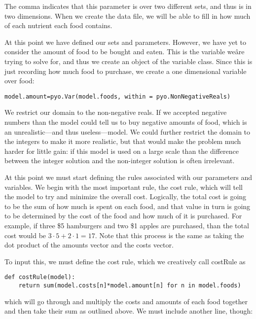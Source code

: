 \documentclass{article}
\begin{document}
The comma indicates that this parameter is over two different sets, and thus is in two dimensions.  When we create the data file, we will be able to fill in how much of each nutrient each food contains.

At this point we have defined our sets and parameters.  However, we have yet to consider the amount of food to be bought and eaten.  This is the variable weâre trying to solve for, and thus we create an object of the variable class.  Since this is just recording how much food to purchase, we create a one dimensional variable over food:

\begin{verbatim}model.amount=pyo.Var(model.foods, within = pyo.NonNegativeReals) \end{verbatim}

We restrict our domain to the non-negative reals.  If we accepted negative numbers than the model could tell us to buy negative amounts of food, which is an unrealistic---and thus useless---model.  We could further restrict the domain to the integers to make it more realistic, but that would make the problem much harder for little gain: if this model is used on a large scale than the difference between the integer solution and the non-integer solution is often irrelevant.

At this point we must start defining the rules associated with our parameters and variables.  We begin with the most important rule, the cost rule, which will tell the model to try and minimize the overall cost.  Logically, the total cost is going to be the sum of how much is spent on each food, and that value in turn is going to be determined by the cost of the food and how much of it is purchased.  For example, if three \$5 hamburgers and two \$1 apples are purchased, than the total cost would be $3 \cdot 5 + 2 \cdot 1 = 17$.  Note that this process is the same as taking the dot product of the amounts vector and the costs vector.

To input this, we must define the cost rule, which we creatively call costRule as

\begin{verbatim}def costRule(model):
    return sum(model.costs[n]*model.amount[n] for n in model.foods)
\end{verbatim}

\noindent
which will go through and multiply the costs and amounts of each food together and then take their sum as outlined above.  We must include another line, though:
\end{document}
